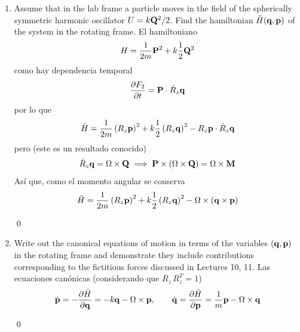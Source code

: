 \documentclass[]{article}
\numberwithin{equation}{section}
\begin{document}
\begin{enumerate}
	Tendremos entonces
	\begin{equation}
		p_a = \pd{F_2}{q_a} , \qquad Q_a = \pd{F_2}{P_a}
	\end{equation}
	por lo que
	\begin{equation}
		F_2 = \int \n{Q} \cdot d\n{P} = \n{P}\cdot R_z \n{q}
	\end{equation}
	
	\qed
	
	\item[(b)] Assume that in the lab frame a particle moves in the field of the spherically symmetric harmonic oscillator $U = k \mathbf{Q}^2/2$. Find the hamiltonian $\tilde{H}(\mathbf{q}, \mathbf{p})$ of the system in the rotating frame.
	\resp El hamiltoniano 
	\begin{equation}
		H = \frac{1}{2m} \mathbf{P}^2 + k \frac{1}{2} \mathbf{Q}^2
	\end{equation}
	como hay dependencia temporal
	\begin{equation}
		\dfrac{\partial F_2}{\partial t} = \mathbf{P}\cdot \dot{R}_z \mathbf{q}
	\end{equation}
	por lo que
	\begin{equation}
		\tilde{H} = \frac{1}{2m} \left(R_z \mathbf{p}\right)^2 + k \frac{1}{2} \left(R_z \mathbf{q}\right)^2 - R_z \mathbf{p} \cdot \dot{R}_z \mathbf{q}
	\end{equation}
	pero (este es un resultado conocido)
	\begin{equation*}
		\dot{R}_z \mathbf{q} = \Omega \times \mathbf{Q} \implies \mathbf{P}\times(\Omega \times \mathbf{Q}) = \Omega \times \mathbf{M} 
	\end{equation*}
	Así que, como el momento angular se conserva 
	\begin{equation}
	\tilde{H} = \frac{1}{2m} \left(R_z \mathbf{p}\right)^2 + k \frac{1}{2} \left(R_z \mathbf{q}\right)^2 - \Omega \times (\mathbf{q} \times \mathbf{p}) 
	\end{equation}
	
	
	\qed
	
	\item[(c)] Write out the canonical equations of motion in terms of the variables $(\mathbf{q}, \mathbf{p})$ in the rotating frame and demonstrate they include contributions corresponding to the fictitious forces discussed in Lectures 10, 11.
	\resp Las ecuaciones canónicas (considerando que $R_z \, R_z^T = 1$)
	\begin{equation}
		\dot{\mathbf{p}} = - \dfrac{\partial \tilde{H}}{\partial \mathbf{q}} = -k \mathbf{q} - \Omega\times\mathbf{p}, \qquad \dot{\mathbf{q}} = \dfrac{\partial \tilde{H}}{\partial \mathbf{p}} = \frac{1}{m} \mathbf{p} - \Omega\times\mathbf{q}
	\end{equation}
	
	\qed
	
\end{enumerate}
\end{document}
